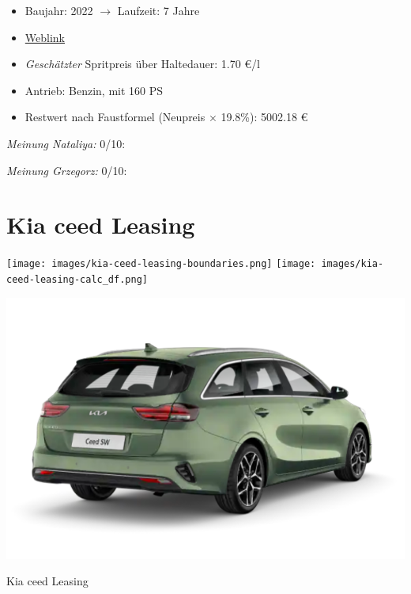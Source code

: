 \documentclass[landscape, DIV=99, 14pt]{scrartcl}
\begin{document}
\begin{itemize}
    \item Baujahr: 2022 $\rightarrow$ Laufzeit: 7 Jahre
    \item \href{https://konfigurator.meinauto.de/kia/neuwagen/cee-d/angebote/cee-d-sporty-wagon/konfigurator/\#!/extras/spirit/8865371/3,11,27/private/109347-4167-291321/1321/61d21ce73c5db/cash-purchase/109348-8088-291322/48,0,10000,0,0,0,0,0,}{Weblink}
    \item \emph{Gesch\"atzter} Spritpreis \"uber Haltedauer: 1.70 \euro{}/l
    \item Antrieb: Benzin, mit 160 PS
    \item Restwert nach Faustformel (Neupreis $\times$ 19.8\%): 5002.18 \euro{}
\end{itemize}

\begin{small}
\emph{Meinung Nataliya:} 0/10: 
        
\emph{Meinung Grzegorz:} 0/10: 
\end{small}

\pagebreak


\twocolumn

\section*{Kia ceed Leasing}
\begin{center}
\texttt{[image: images/kia-ceed-leasing-boundaries.png]}
\null
\vspace{0.5cm}
\texttt{[image: images/kia-ceed-leasing-calc\_df.png]}
\end{center}

\pagebreak
\begin{center}
\includegraphics[width=0.9\columnwidth]{cars/kia-ceed-sportswagon-leasing.png}

Kia ceed Leasing
\end{center}
\end{document}
